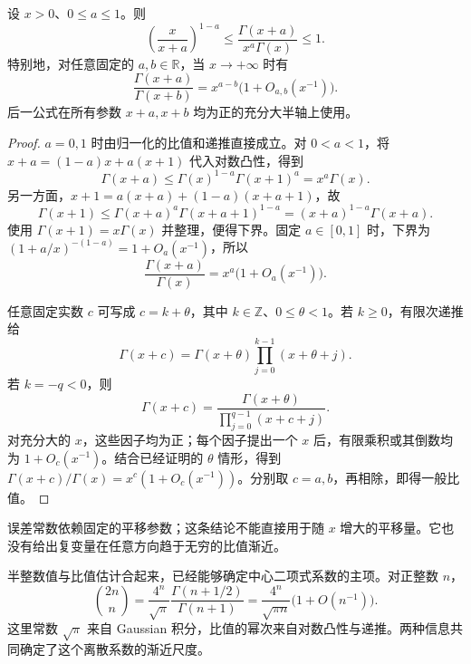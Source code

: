 \begin{proposition}[固定实平移的比值]\label{b3:prop:21-shift-ratio}
设 \(x>0\)、\(0\le a\le1\)。则
\[
 \left(\frac{x}{x+a}\right)^{1-a}
 \le\frac{\Gamma(x+a)}{x^a\Gamma(x)}\le1.
\]
特别地，对任意固定的 \(a,b\in\mathbb R\)，当 \(x\to+\infty\) 时有
\[
 \frac{\Gamma(x+a)}{\Gamma(x+b)}
 =x^{a-b}\bigl(1+O_{a,b}(x^{-1})\bigr).
\]
后一公式在所有参数 \(x+a,x+b\) 均为正的充分大半轴上使用。
\end{proposition}
\begin{proof}
\(a=0,1\) 时由归一化的比值和递推直接成立。对 \(0<a<1\)，将 \(x+a=(1-a)x+a(x+1)\) 代入对数凸性，得到
\[
 \Gamma(x+a)\le\Gamma(x)^{1-a}\Gamma(x+1)^a
 =x^a\Gamma(x).
\]
另一方面，\(x+1=a(x+a)+(1-a)(x+a+1)\)，故
\[
 \Gamma(x+1)
 \le\Gamma(x+a)^a\Gamma(x+a+1)^{1-a}
 =(x+a)^{1-a}\Gamma(x+a).
\]
使用 \(\Gamma(x+1)=x\Gamma(x)\) 并整理，便得下界。固定 \(a\in[0,1]\) 时，下界为 \((1+a/x)^{-(1-a)}=1+O_a(x^{-1})\)，所以
\[
 \frac{\Gamma(x+a)}{\Gamma(x)}=x^a\bigl(1+O_a(x^{-1})\bigr).
\]

任意固定实数 \(c\) 可写成 \(c=k+\theta\)，其中 \(k\in\mathbb Z\)、\(0\le\theta<1\)。若 \(k\ge0\)，有限次递推给
\[
 \Gamma(x+c)=\Gamma(x+\theta)
             \prod_{j=0}^{k-1}(x+\theta+j).
\]
若 \(k=-q<0\)，则
\[
 \Gamma(x+c)=\frac{\Gamma(x+\theta)}
 {\prod_{j=0}^{q-1}(x+c+j)}.
\]
对充分大的 \(x\)，这些因子均为正；每个因子提出一个 \(x\) 后，有限乘积或其倒数均为 \(1+O_c(x^{-1})\)。结合已经证明的 \(\theta\) 情形，得到 \(\Gamma(x+c)/\Gamma(x)=x^c(1+O_c(x^{-1}))\)。分别取 \(c=a,b\)，再相除，即得一般比值。
\end{proof}
误差常数依赖固定的平移参数；这条结论不能直接用于随 \(x\) 增大的平移量。它也没有给出复变量在任意方向趋于无穷的比值渐近。

\ProseParagraphBreak

半整数值与比值估计合起来，已经能够确定中心二项式系数的主项。对正整数 \(n\)，
\[
 \binom{2n}{n}
 =\frac{4^n}{\sqrt\pi}
   \frac{\Gamma(n+1/2)}{\Gamma(n+1)}
 =\frac{4^n}{\sqrt{\pi n}}\bigl(1+O(n^{-1})\bigr).
\]
这里常数 \(\sqrt\pi\) 来自 Gaussian 积分，比值的幂次来自对数凸性与递推。两种信息共同确定了这个离散系数的渐近尺度。

